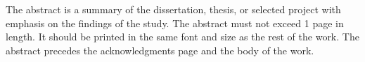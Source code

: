 The abstract is a summary of the dissertation, thesis, or selected project with emphasis on the findings of the study.  The abstract must not exceed 1 page in length.  It should be printed in the same font and size as the rest of the work.  The abstract precedes the acknowledgments page and the body of the work.
